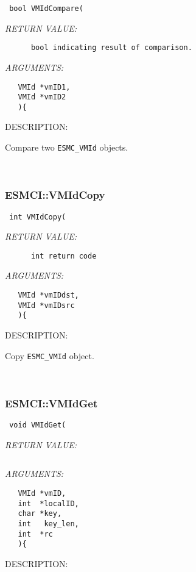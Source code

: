   
\begin{verbatim} bool VMIdCompare(\end{verbatim}{\em RETURN VALUE:}
\begin{verbatim}      bool indicating result of comparison.\end{verbatim}{\em ARGUMENTS:}
\begin{verbatim}   VMId *vmID1,
   VMId *vmID2
   ){\end{verbatim}
{\sf DESCRIPTION:\\ }


      Compare two {\tt ESMC\_VMId} objects.
   
 
\mbox{}\hrulefill\
 
\subsubsection [ESMCI::VMIdCopy] {ESMCI::VMIdCopy}


  
\begin{verbatim} int VMIdCopy(\end{verbatim}{\em RETURN VALUE:}
\begin{verbatim}      int return code\end{verbatim}{\em ARGUMENTS:}
\begin{verbatim}   VMId *vmIDdst,
   VMId *vmIDsrc
   ){\end{verbatim}
{\sf DESCRIPTION:\\ }


      Copy {\tt ESMC\_VMId} object.
   
 
\mbox{}\hrulefill\
 
\subsubsection [ESMCI::VMIdGet] {ESMCI::VMIdGet}


  
\begin{verbatim} void VMIdGet(\end{verbatim}{\em RETURN VALUE:}
\begin{verbatim} \end{verbatim}{\em ARGUMENTS:}
\begin{verbatim}   VMId *vmID,
   int  *localID,
   char *key,
   int   key_len,
   int  *rc
   ){\end{verbatim}
{\sf DESCRIPTION:\\ }


